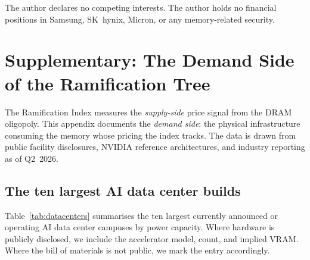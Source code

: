 \documentclass[12pt]{article}
\theoremstyle{definition}
\begin{document}
The author declares no competing interests. The author holds no financial positions in Samsung, SK~hynix, Micron, or any memory-related security.


\appendix

\section{Supplementary: The Demand Side of the Ramification Tree}
\label{app:datacenters}

The Ramification Index measures the \emph{supply-side} price signal from the DRAM oligopoly. This appendix documents the \emph{demand side}: the physical infrastructure consuming the memory whose pricing the index tracks. The data is drawn from public facility disclosures, NVIDIA reference architectures, and industry reporting as of Q2~2026.

\subsection{The ten largest AI data center builds}

Table~\ref{tab:datacenters} summarises the ten largest currently announced or operating AI data center campuses by power capacity. Where hardware is publicly disclosed, we include the accelerator model, count, and implied VRAM. Where the bill of materials is not public, we mark the entry accordingly.
\end{document}
